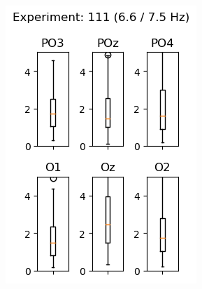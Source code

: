 \begin{figure}[ht]
\begin{subfigure}{0.3\textwidth}
        \includegraphics[width=\linewidth]{images/results/1116675.png}
        \label{fig:1116675}
    \end{subfigure}
    \hfill
    \begin{subfigure}{0.3\textwidth}

\end{subfigure}
\end{figure}
